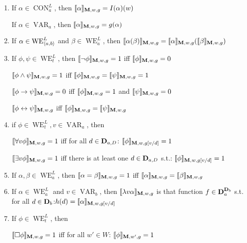 \documentclass[11pt]{article}
\DeclareMathOperator{\VAR}{VAR}
\DeclareMathOperator{\CON}{CON}
\DeclareMathOperator{\WE}{WE}
\begin{document}
\begin{definition}[]
\begin{enumerate}
\item If \(\alpha\in\CON_a^L\), then
\(\llbracket\alpha\rrbracket_{\operatorname{\textbf{M}},w,g}=I(\alpha)(w)\)

If \(\alpha\in\VAR_a\), then \(\llbracket\alpha\rrbracket_{\operatorname{\textbf{M}},w,g}=g(\alpha)\)

\item If \(\alpha\in\WE_{\la a,b\ra}^L\) and \(\beta\in\WE_a^L\), then
\(\llbracket\alpha(\beta)\rrbracket_{\operatorname{\textbf{M}},w,g}=\llbracket\alpha
       \rrbracket_{\operatorname{\textbf{M}},w,g}(\llbracket\beta\rrbracket_{\operatorname{\textbf{M}},w,g})\)

\item If \(\phi,\psi\in\WE_t^L\), then \(\llbracket\neg\phi\rrbracket_{\operatorname{\textbf{M}},w,g}=1\)
iff \(\llbracket\phi\rrbracket_{\operatorname{\textbf{M}},w,g}=0\)

\(\llbracket\phi\wedge\psi\rrbracket_{\operatorname{\textbf{M}},w,g}=1\) iff
\(\llbracket\phi\rrbracket_{\operatorname{\textbf{M}},w,g}=\llbracket\psi\rrbracket_{\operatorname{\textbf{M}},w,g}=1\)

\(\llbracket\phi\to\psi\rrbracket_{\operatorname{\textbf{M}},w,g}=0\) iff
\(\llbracket\phi\rrbracket_{\operatorname{\textbf{M}},w,g}=1\) and
\(\llbracket\psi\rrbracket_{\operatorname{\textbf{M}},w,g}=0\)

\(\llbracket\phi\leftrightarrow\psi\rrbracket_{\operatorname{\textbf{M}},w,g}\) iff
\(\llbracket\phi\rrbracket_{\operatorname{\textbf{M}},w,g}=\llbracket\psi\rrbracket_{\operatorname{\textbf{M}},w,g}\)

\item if \(\phi\in \WE_t^L,v\in \VAR_a\), then

\(\llbracket\forall v\phi\rrbracket_{\operatorname{\textbf{M}},w,g}=1\) iff for all
\(d\in\operatorname{\textbf{D}}_{a,D}\):
\(\llbracket\phi\rrbracket_{\operatorname{\textbf{M}},w,g[v/d]}=1\)

\(\llbracket\exists v\phi\rrbracket_{\operatorname{\textbf{M}},w,g}=1\) iff there is at least one
\(d\in\operatorname{\textbf{D}}_{a,D}\) s.t.: \(\llbracket\phi\rrbracket_{\operatorname{\textbf{M}},w,g[v/d]}=1\)

\item If \(\alpha,\beta\in \WE_a^L\), then
\(\llbracket\alpha=\beta\rrbracket_{\operatorname{\textbf{M}},w,g}=1\) iff
\(\llbracket\alpha\rrbracket_{\operatorname{\textbf{M}},w,g}=\llbracket\beta\rrbracket_{\operatorname{\textbf{M}},w,g}\)

\item If \(\alpha\in\WE_a^L\) and \(v\in\VAR_b\), then \(\llbracket\lambda
      v\alpha\rrbracket_{\operatorname{\textbf{M}},w,g}\) is that function \(f\in\operatorname{\textbf{D}}_a^{\operatorname{\textbf{D}}_b}\) s.t.
for all \(d\in \operatorname{\textbf{D}}_b\):\(h(d)=\llbracket\alpha\rrbracket_{\operatorname{\textbf{M}},w,g[v/d]}\)

\item If \(\phi\in\WE_t^L\), then

\(\llbracket\Box\phi\rrbracket_{\operatorname{\textbf{M}},w,g}=1\) iff for all \(w'\in W\):
\(\llbracket\phi\rrbracket_{\operatorname{\textbf{M}},w',g}=1\)


\end{enumerate}
\end{definition}
\end{document}
